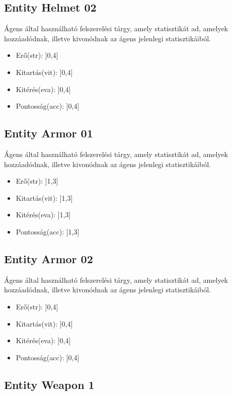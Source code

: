 \subsection{Entity Helmet 02}


Ágens által használható felszerelési tárgy, amely statisztikát ad, amelyek hozzáadódnak, illetve kivonódnak az ágens jelenlegi statisztikáiból.

\begin{itemize}
    \item Erő(str): ]0,4]
    \item Kitartás(vit): ]0,4]
    \item Kitérés(eva): ]0,4]
    \item Pontosság(acc): ]0,4]
\end{itemize}

\subsection{Entity Armor 01}

Ágens által használható felszerelési tárgy, amely statisztikát ad, amelyek hozzáadódnak, illetve kivonódnak az ágens jelenlegi statisztikáiból.

\begin{itemize}
    \item Erő(str): ]1,3]
    \item Kitartás(vit): ]1,3]
    \item Kitérés(eva): ]1,3]
    \item Pontosság(acc): ]1,3]
\end{itemize}

\subsection{Entity Armor 02}


Ágens által használható felszerelési tárgy, amely statisztikát ad, amelyek hozzáadódnak, illetve kivonódnak az ágens jelenlegi statisztikáiból.

\begin{itemize}
    \item Erő(str): ]0,4]
    \item Kitartás(vit): ]0,4]
    \item Kitérés(eva): ]0,4]
    \item Pontosság(acc): ]0,4]
\end{itemize}

\subsection{Entity Weapon 1}

